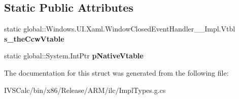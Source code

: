 \subsection*{Static Public Attributes}
\begin{DoxyCompactItemize}
\item 
\mbox{\label{struct_windows_1_1_u_i_1_1_xaml_1_1_window_closed_event_handler_____impl_1_1_vtbl_a0edfef1ebab8be484b7555d9f2278344}} 
static global\+::\+Windows.\+U\+I.\+Xaml.\+Window\+Closed\+Event\+Handler\+\_\+\+\_\+\+Impl.\+Vtbl {\bfseries s\+\_\+the\+Ccw\+Vtable}
\item 
\mbox{\label{struct_windows_1_1_u_i_1_1_xaml_1_1_window_closed_event_handler_____impl_1_1_vtbl_a449cdc66ed48cce9160574bde8e1b709}} 
static global\+::\+System.\+Int\+Ptr {\bfseries p\+Native\+Vtable}
\end{DoxyCompactItemize}


The documentation for this struct was generated from the following file\+:\begin{DoxyCompactItemize}
\item 
I\+V\+S\+Calc/bin/x86/\+Release/\+A\+R\+M/ilc/Impl\+Types.\+g.\+cs\end{DoxyCompactItemize}
